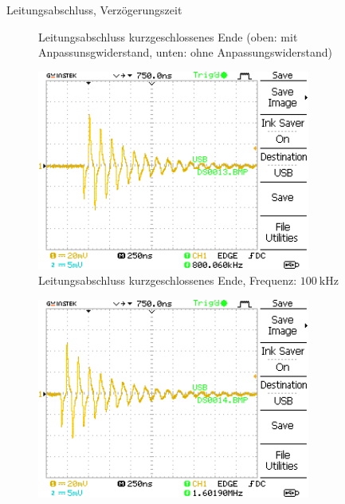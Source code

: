 \documentclass[ngerman]{scrartcl}
\theoremstyle{definition}
\begin{document}
\begin{aufgabe}{Leitungsabschluss, Verzögerungszeit}
\begin{unteraufgabe}
\begin{figure}[H]
					\caption{Leitungsabschluss kurzgeschlossenes Ende (oben: mit Anpassunsgwiderstand, unten: ohne Anpassungswiderstand)}
					\label{fig:DS000}
				\end{figure}
			\end{unteraufgabe}
			\begin{unteraufgabe}
				\begin{figure}[H]
					\centering
					\includegraphics[width=0.8\textwidth]{MesswerteVersuch1/DS0013.png}	

					\caption{Leitungsabschluss kurzgeschlossenes Ende, Frequenz: $\SI{100}{\kilo\hertz}$}
					\label{fig:DS0013}
				\end{figure}
				\begin{figure}[H]
					\centering
					\includegraphics[width=0.8\textwidth]{MesswerteVersuch1/DS0014.png}	


\end{figure}
\end{unteraufgabe}
\end{aufgabe}
\end{document}
